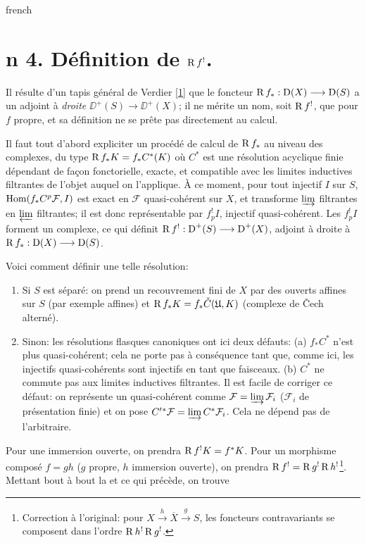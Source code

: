 \begin{hyphenrules}{french}
\section*{n\textdegree{} 4. D\'efinition de $\operatorname{R} f^{!}$.}\label{app:sec4}

Il r\'esulte d'un tapis g\'en\'eral de Verdier \hyperref[app:bib1]{[1]} que le foncteur $\operatorname{R} f_{*}: \operatorname{D}(X) \longrightarrow \operatorname{D}(S)$ a un adjoint \`a \emph{droite} $\DD^{+}(S) \longrightarrow \DD^{+}(X)$; il ne m\'erite un nom, soit $\operatorname{R} f^{!}$, que pour $f$ propre, et sa d\'efinition ne se pr\^ete pas directement au calcul.

Il faut tout d'abord expliciter un proc\'ed\'e de calcul de $\operatorname{R} f_{*}$ au niveau des complexes, du type $\operatorname{R} f_{*}K = f_{*}C^{*}(K)$ o\`u $C^{*}$ est une r\'esolution acyclique finie d\'ependant de fa\c{c}on fonctorielle, exacte, et compatible avec les limites inductives filtrantes de l'objet auquel on l'applique. \`A ce moment, pour tout injectif $I$ sur $S$, $\operatorname{Hom}(f_{*}C^{p}\mathcal{F}, I)$ est exact en $\mathcal{F}$ quasi-coh\'erent sur $X$, et transforme $\varinjlim$ filtrantes en $\varprojlim$ filtrantes; il est donc repr\'esentable par $f_{p}^{!}I$, injectif quasi-coh\'erent. Les $f_{p}^{!}I$ forment un complexe, ce qui d\'efinit $\operatorname{R} f^{!}:\operatorname{D}^{+}(S)\longrightarrow\operatorname{D}^{+}(X)$, adjoint \`a droite \`a $\operatorname{R} f_{*}:\operatorname{D}(X)\longrightarrow\operatorname{D}(S)$.

Voici comment d\'efinir une telle r\'esolution:
\begin{enumerate}
\item[1)] Si $S$ est s\'epar\'e: on prend un recouvrement fini de $X$ par des ouverts affines sur $S$ (par exemple affines) et $\operatorname{R} f_{*}K = f_{*}\check{C}(\mathfrak{U},K)$ (complexe de \v{C}ech altern\'e).

\item[2)] Sinon: les r\'esolutions flasques canoniques ont ici deux d\'efauts: (a) $f_{*}C^{*}$ n'est plus quasi-coh\'erent; cela ne porte pas \`a cons\'equence tant que, comme ici, les injectifs quasi-coh\'erents sont injectifs en tant que faisceaux. (b) $C^{*}$ ne commute pas aux limites inductives filtrantes. Il est facile de corriger ce d\'efaut: on repr\'esente un quasi-coh\'erent comme $\mathcal{F} = \varinjlim \mathcal{F}_i$ ($\mathcal{F}_i$ de pr\'esentation finie) et on pose $C'{}^{*}\mathcal{F} = \varinjlim C^{*}\mathcal{F}_i$. Cela ne d\'epend pas de l'arbitraire.
\end{enumerate}

Pour une immersion ouverte, on prendra $\operatorname{R} f^{!}K = f^{*}K$. Pour un morphisme compos\'e $f = gh$ ($g$ propre, $h$ immersion ouverte), on prendra $\operatorname{R} f^{!} = \operatorname{R} g^{!}\operatorname{R} h^{!}$\footnote{Correction \`a l'original: pour $X\xrightarrow{h}\overline{X}\xrightarrow{g}S$, les foncteurs contravariants se composent dans l'ordre $\operatorname{R} h^{!}\operatorname{R} g^{!}$.}. Mettant bout \`a bout la  et ce qui pr\'ec\`ede, on trouve


\end{hyphenrules}
